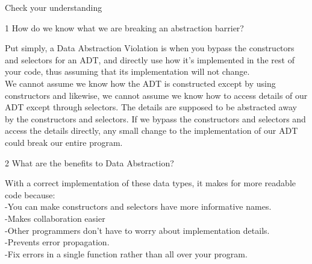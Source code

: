 \question 
Check your understanding
\begin{paragraph}
1 How do we know what we are breaking an abstraction barrier? 
\end{paragraph}
\begin{solution}
Put simply, a Data Abstraction Violation is when you bypass the constructors and selectors for an ADT, and directly use how it’s implemented in the rest of your code, thus assuming that its implementation will not change. \\ 
We cannot assume we know how the ADT is constructed except by using constructors and likewise, we cannot assume we know how to access details of our ADT except through selectors. The details are supposed to be abstracted away by the constructors and selectors. If we bypass the constructors and selectors and access the details directly, any small change to the implementation of our ADT could break our entire program.
\end{solution}
\begin{paragraph}
2 What are the benefits to Data Abstraction? 
\end{paragraph}
\begin{solution}
With a correct implementation of these data types, it makes for more readable code because: \\ 
-You can make constructors and selectors have more informative names. \\ 
-Makes collaboration easier \\ 
-Other programmers don't have to worry about implementation details. \\ 
-Prevents error propagation. \\
-Fix errors in a single function rather than all over your program.

\end{solution}